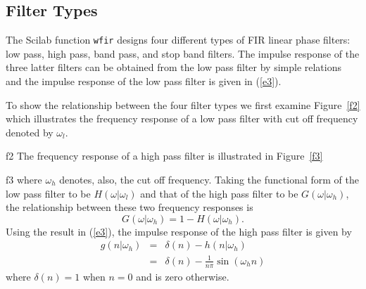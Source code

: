 \subsection{Filter Types}
\label{s2}

The Scilab function {\tt wfir} designs four different types
of FIR linear phase filters: low pass, high pass,
band pass, and stop band filters.  The impulse response of the three
latter filters can be obtained from the low pass filter by
simple relations and the impulse response of the
low pass filter is given in (\ref{e3}).

To show the relationship between the four filter types we
first examine Figure~\ref{f2} which illustrates the frequency
response of a low pass filter with cut off frequency denoted
by $\omega_l$.
%

{f2}
%
The frequency response of a 
high pass filter is illustrated in Figure~\ref{f3}
%

{f3}
%
where $\omega_h$ denotes, also, the cut off frequency.
Taking the functional form of the low pass filter to be
$H(\omega|\omega_l)$ and that of the high pass filter
to be $G(\omega|\omega_h)$, the relationship between
these two frequency responses is 
%
\begin{equation}
G(\omega|\omega_h)=1-H(\omega|\omega_h).
\label{e5}
\end{equation}
%
Using the result in (\ref{e3}), the impulse response of the high pass
filter is given by
%
\begin{eqnarray}
g(n|\omega_h) &=& \delta(n)-h(n|\omega_h) \\
              &=& \delta(n)-\frac{1}{n\pi}\sin(\omega_hn)
\label{e6}
\end{eqnarray}
%
where $\delta(n)=1$ when $n=0$ and is zero otherwise.


